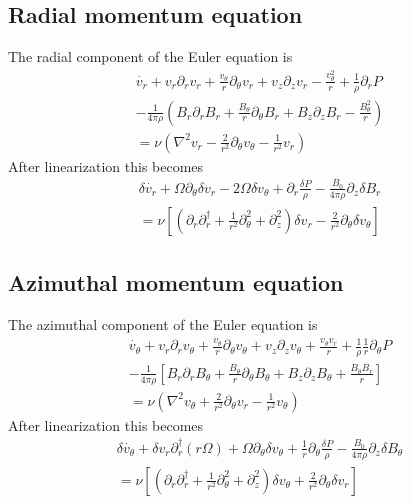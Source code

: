 \documentclass[letterpaper]{article}
\begin{document}
\subsection{Radial momentum equation}

The radial component of the Euler equation is
\begin{align}
\dot{v_r} + v_r \partial_r v_r + \frac{v_\theta}{r}\partial_\theta v_r + v_z \partial_z v_r - \frac{v_\theta^2}{r}+\frac{1}{\rho}\partial_r P 
\nonumber \\
- \frac{1}{4\pi\rho}\left(B_r \partial_r B_r + \frac{B_\theta}{r}\partial_\theta B_r + B_z \partial_z B_r - \frac{B_\theta^2}{r}\right)
\nonumber \\
 = \nu\left(\nabla^2 v_r -\frac{2}{r^2}\partial_\theta v_\theta - \frac{1}{r^2}v_r\right)
\end{align}
After linearization this becomes
\begin{align}
\delta\dot{v_r} + \Omega \partial_\theta \delta v_r - 2\Omega\delta v_\theta + \partial_r \frac{\delta P}{\rho} - \frac{B_0}{4\pi\rho}\partial_z \delta B_r
\nonumber \\
= \nu \left[\left(\partial_r \partial_r^\dagger + \frac{1}{r^2}\partial_\theta^2 + \partial_z^2\right)\delta v_r - \frac{2}{r^2}\partial_\theta \delta v_\theta\right]
\end{align}

\subsection{Azimuthal momentum equation}
The azimuthal component of the Euler equation is
\begin{align}
\dot{v_\theta} + v_r \partial_r v_\theta + \frac{v_\theta}{r}\partial_\theta v_\theta + v_z \partial_z v_\theta + \frac{v_\theta v_r}{r} + \frac{1}{\rho}\frac{1}{r}\partial_\theta P 
\nonumber \\
-\frac{1}{4\pi\rho}\left[B_r\partial_r B_\theta + \frac{B_\theta}{r}\partial_\theta B_\theta + B_z \partial_z B_\theta + \frac{B_\theta B_r}{r}\right]
\nonumber \\
= \nu\left(\nabla^2 v_\theta + \frac{2}{r^2}\partial_\theta v_r - \frac{1}{r^2}v_\theta \right)
\end{align}
After linearization this becomes
\begin{align}
\delta \dot{v_\theta} + \delta v_r \partial_r^\dagger(r\Omega) + \Omega \partial_\theta \delta v_\theta + \frac{1}{r}\partial_\theta \frac{\delta P}{\rho} - \frac{B_0}{4\pi\rho} \partial_z \delta B_\theta
\nonumber \\
= \nu\left[\left(\partial_r \partial_r^\dagger + \frac{1}{r^2}\partial_\theta^2 + \partial_z^2\right)\delta v_\theta + \frac{2}{r^2}\partial_\theta \delta v_r \right]
\end{align}
\end{document}
